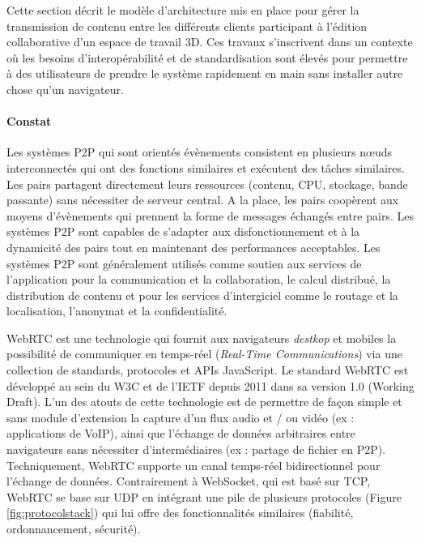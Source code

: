Cette section décrit le modèle d'architecture mis en 
place pour gérer la transmission de contenu entre les différents clients 
participant à l'édition collaborative d'un espace de travail 3D. 
Ces travaux s'inscrivent dans un contexte où les besoins d'interopérabilité 
et de standardisation sont élevés pour permettre à des utilisateurs de 
prendre le système rapidement en main sans installer autre chose qu'un 
navigateur. 

\paragraph{Constat}

Les systèmes \gls{P2P} qui sont orientés évènements consistent en plusieurs n\oe uds 
interconnectés qui ont des fonctions similaires et exécutent des tâches 
similaires. Les pairs partagent directement leurs ressources (contenu, CPU, 
stockage, bande passante) sans nécessiter de serveur central. A la place, les 
pairs coopèrent aux moyens d'évènements qui prennent la forme de messages 
échangés entre pairs. Les systèmes \gls{P2P} sont capables de s'adapter aux 
disfonctionnement et à la dynamicité des pairs tout en maintenant des 
performances acceptables. Les systèmes \gls{P2P} sont généralement utilisés comme 
soutien aux services de l'application pour la communication et la collaboration, le 
calcul distribué, la distribution de contenu et pour les services d'intergiciel comme 
le routage et la localisation, l'anonymat et la confidentialité.

\gls{WebRTC} est une technologie qui fournit aux navigateurs 
\textit{destkop} et mobiles la possibilité de communiquer en temps-réel 
(\textit{Real-Time Communications}) via une collection de standards, 
protocoles et \glspl{API} JavaScript. 
Le standard \gls{WebRTC} est développé au sein du \gls{W3C} et de 
l'\gls{IETF} depuis 2011 dans sa version 1.0 (Working Draft). 
L'un des atouts de cette technologie est de permettre de façon simple et 
sans module d'extension la capture d'un flux audio et / ou vidéo (ex : 
applications de VoIP), ainsi que l'échange de données arbitraires entre 
navigateurs sans nécessiter d'intermédiaires (ex : partage de fichier en 
\gls{P2P}).
Techniquement, \gls{WebRTC} supporte un canal temps-réel 
bidirectionnel pour l'échange de données. Contrairement à 
\gls{WebSocket}, qui est basé sur \gls{TCP}, \gls{WebRTC} se base sur 
\acrshort{UDP} en intégrant une pile de plusieurs protocoles (Figure 
\ref{fig:protocolstack}) qui lui offre des fonctionnalités similaires (fiabilité, 
ordonnancement, sécurité). 

